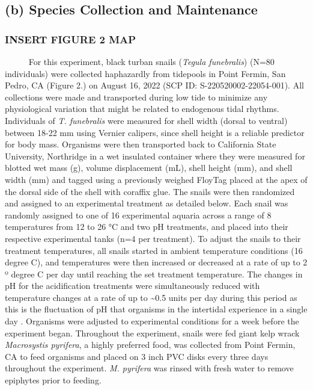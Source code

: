 \documentclass[
  12pt,
]{article}
\begin{document}
\hypertarget{b-species-collection-and-maintenance}{%
\subsection{(b) Species Collection and
Maintenance}\label{b-species-collection-and-maintenance}}

\hypertarget{insert-figure-2-map}{%
\subsubsection{INSERT FIGURE 2 MAP}\label{insert-figure-2-map}}

~~~~~ For this experiment, black turban snails
(\emph{Tegula funebralis}) (N=80 individuals) were collected haphazardly
from tidepools in Point Fermin, San Pedro, CA (Figure 2.) on August 16,
2022 (SCP ID: S-220520002-22054-001). All collections were made and
transported during low tide to minimize any physiological variation that
might be related to endogenous tidal rhythms. Individuals of
\emph{T. funebralis} were measured for shell width (dorsal to ventral)
between 18-22 mm using Vernier calipers, since shell height is a
reliable predictor for body mass. Organisms were then transported back
to California State University, Northridge in a wet insulated container
where they were measured for blotted wet mass (g), volume displacement
(mL), shell height (mm), and shell width (mm) and tagged using a
previously weighed FloyTag placed at the apex of the dorsal side of the
shell with coraffix glue. The snails were then randomized and assigned
to an experimental treatment as detailed below. Each snail was randomly
assigned to one of 16 experimental aquaria across a range of 8
temperatures from 12 to 26 °C and two pH treatments, and placed into
their respective experimental tanks (n=4 per treatment). To adjust the
snails to their treatment temperatures, all snails started in ambient
temperature conditions (16 degree C), and temperatures were then
increased or decreased at a rate of up to 2 º degree C per day until
reaching the set treatment temperature. The changes in pH for the
acidification treatments were simultaneously reduced with temperature
changes at a rate of up to \textasciitilde0.5 units per day during this
period as this is the fluctuation of pH that organisms in the intertidal
experience in a single day \cite{jellison2016ocean}. Organisms were
adjusted to experimental conditions for a week before the experiment
began. Throughout the experiment, snails were fed giant kelp wrack
\emph{Macrosystis pyrifera}, a highly preferred food, was collected from
Point Fermin, CA to feed organisms and placed on 3 inch PVC disks every
three days throughout the experiment. \emph{M. pyrifera} was rinsed with
fresh water to remove epiphytes prior to feeding.
\end{document}
